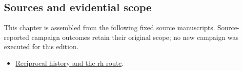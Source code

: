 \subsection{Sources and evidential
scope}\label{viii-ch09-sources-and-evidential-scope}

This chapter is assembled from the following fixed source manuscripts.
Source-reported campaign outcomes retain their original scope; no new
campaign was executed for this edition.

\begin{itemize}
\tightlist
\item
  \href{https://github.com/iwtbotiwtwot/SAMA/blob/4c2b5dc1649da5900c90b90d0ce56c223dbb7717/vol_iii/03-writes-and-history/reciprocal-history-and-the-rh-route.md}{Reciprocal
  history and the rh route}.
\end{itemize}

